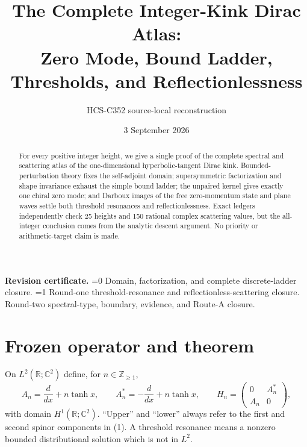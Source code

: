 \documentclass[10pt]{article}
\title{The Complete Integer-Kink Dirac Atlas:\\
Zero Mode, Bound Ladder, Thresholds, and Reflectionlessness}
\author{HCS-C352 source-local reconstruction}
\date{3 September 2026}
\providecommand{\CRevisionRound}{2}
\theoremstyle{remark}
\newcommand{\R}{\mathbb R}
\begin{document}
\maketitle

\begin{abstract}
For every positive integer height, we give a single proof of the complete
spectral and scattering atlas of the one-dimensional hyperbolic-tangent
Dirac kink.  Bounded-perturbation theory fixes the self-adjoint domain;
supersymmetric factorization and shape invariance exhaust the simple bound
ladder; the unpaired kernel gives exactly one chiral zero mode; and Darboux
images of the free zero-momentum state and plane waves settle both threshold
resonances and reflectionlessness.  Exact ledgers independently check 25
heights and 150 rational complex scattering values, but the all-integer
conclusion comes from the analytic descent argument.  No priority or
arithmetic-target claim is made.
\end{abstract}

\noindent\textbf{Revision certificate.}
\ifnum\CRevisionRound=0
Domain, factorization, and complete discrete-ladder closure.
\else\ifnum\CRevisionRound=1
Round-one threshold-resonance and reflectionless-scattering closure.
\else
Round-two spectral-type, boundary, evidence, and Route-A closure.
\fi\fi
\small

\section{Frozen operator and theorem}

On $L^2(\R;\mathbb C^2)$ define, for $n\in\mathbb Z_{\geq1}$,
\[
 A_n=\frac d{dx}+n\tanh x,\qquad
 A_n^*=-\frac d{dx}+n\tanh x,
 \qquad
 H_n=\begin{pmatrix}0&A_n^*\\A_n&0\end{pmatrix},          \tag{1}
\]
with domain $H^1(\R;\mathbb C^2)$.  ``Upper'' and ``lower'' always refer
to the first and second spinor components in (1).  A threshold resonance
means a nonzero bounded distributional solution which is not in $L^2$.
\end{document}
